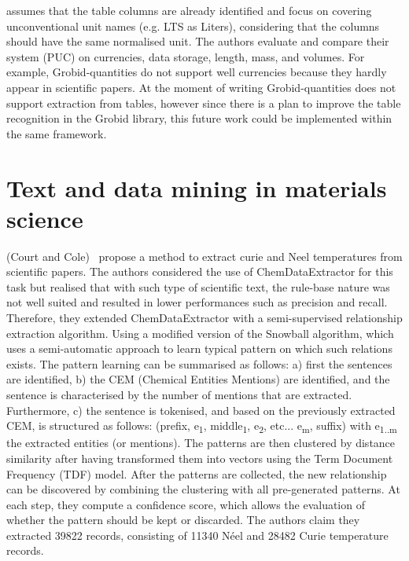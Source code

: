 \cite{taha2021identifying} assumes that the table columns are already identified and focus on covering unconventional unit names (e.g. LTS as Liters), considering that the columns should have the same normalised unit. The authors evaluate and compare their system (PUC) on currencies, data storage, length, mass, and volumes. For example, Grobid-quantities do not support well currencies because they hardly appear in scientific papers. At the moment of writing Grobid-quantities does not support extraction from tables, however since there is a plan to improve the table recognition in the Grobid library, this future work could be implemented within the same framework. 


\section{Text and data mining in materials science}

(Court and Cole)~\cite{court2018auto} propose a method to extract curie and Neel temperatures from scientific papers. 
The authors considered the use of ChemDataExtractor for this task but realised that with such type of scientific text, the rule-base nature was not well suited and resulted in lower performances such as precision and recall. 
Therefore, they extended ChemDataExtractor with a semi-supervised relationship extraction algorithm. 
Using a modified version of the Snowball algorithm, which uses a semi-automatic approach to learn typical pattern on which such relations exists. 
The pattern learning can be summarised as follows: a) first the sentences are identified, b) the CEM (Chemical Entities Mentions) are identified, and the sentence is characterised by the number of mentions that are extracted. 
Furthermore, c) the sentence is tokenised, and based on the previously extracted CEM, is structured as follows: (prefix, e\textsubscript{1}, middle\textsubscript{1}, e\textsubscript{2}, etc... e\textsubscript{m}, suffix) with e\textsubscript{1..m} the extracted entities (or mentions).
The patterns are then clustered by distance similarity after having transformed them into vectors using the Term Document Frequency (TDF) model.
After the patterns are collected, the new relationship can be discovered by combining the clustering with all pre-generated patterns. 
At each step, they compute a confidence score, which allows the evaluation of whether the pattern should be kept or discarded. 
The authors claim they extracted 39822 records, consisting of 11340 Néel and 28482 Curie temperature records. 

